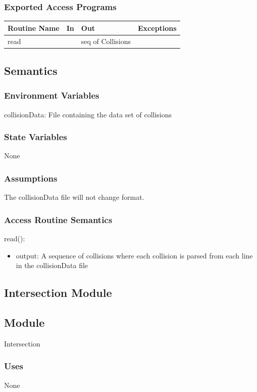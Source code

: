\documentclass[12pt]{article}
\begin{document}
\subsubsection*{Exported Access Programs}
    \begin{tabular}{|l|l|l|l|}
    \hline
    \textbf{Routine Name} & \textbf{In} & \textbf{Out} & \textbf{Exceptions}\\
    \hline
    read & ~ & seq of Collisions & ~\\
    \hline
    \end{tabular}
    
\subsection*{Semantics}
\subsubsection*{Environment Variables}
collisionData: File containing the data set of collisions

\subsubsection*{State Variables}
None

\subsubsection*{Assumptions}
The collisionData file will not change format.

\subsubsection*{Access Routine Semantics}

read():
\begin{itemize}
    \item output: A sequence of collisions where each collision is parsed from each line in the collisionData file
\end{itemize}

\newpage
\subsection{Intersection Module}
\subsection*{Module}
Intersection

\subsubsection*{Uses}
None
\end{document}
